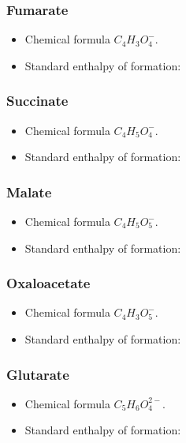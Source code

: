 \documentclass{article}
\begin{document}
\subsubsection{Fumarate}
\begin{itemize}
    \item Chemical formula $C_4H_3O_4^-$.
    \item Standard enthalpy of formation:
\end{itemize}

\subsubsection{Succinate}
\begin{itemize}
    \item Chemical formula $C_4H_5O_4^-$.
    \item Standard enthalpy of formation:
\end{itemize}

\subsubsection{Malate}
\begin{itemize}
    \item Chemical formula $C_4H_5O_5^-$.
    \item Standard enthalpy of formation:
\end{itemize}

\subsubsection{Oxaloacetate}
\begin{itemize}
    \item Chemical formula $C_4H_3O_5^-$.
    \item Standard enthalpy of formation:
\end{itemize}

\subsubsection{Glutarate}
\begin{itemize}
    \item Chemical formula $C_5H_6O_4^{2-}$.
    \item Standard enthalpy of formation:
\end{itemize}
\end{document}
